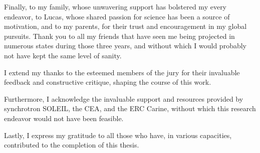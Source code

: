 Finally, to my family, whose unwavering support has bolstered my every endeavor, to Lucas, whose shared passion for science has been a source of motivation, and to my parents, for their trust and encouragement in my global pursuits.
Thank you to all my friends that have seen me being projected in numerous states during those three years, and without which I would probably not have kept the same level of sanity.

I extend my thanks to the esteemed members of the jury for their invaluable feedback and constructive critique, shaping the course of this work.

Furthermore, I acknowledge the invaluable support and resources provided by synchrotron SOLEIL, the CEA, and the ERC Carine, without which this research endeavor would not have been feasible.

Lastly, I express my gratitude to all those who have, in various capacities, contributed to the completion of this thesis.

\newpage